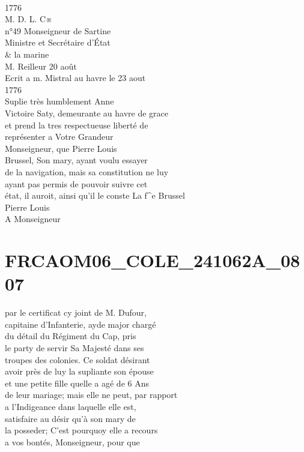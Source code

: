 \documentclass{article}
\begin{document}
\begin{pages}
\footnotesize \\
1776\\
M. D. L. C※\\
n°49
\normalsize \pstart
Monseigneur de Sartine\\
Ministre et Secrétaire d'État\\
\& la marine\\
M. Reilleur 20 août\\
Ecrit a m. Mistral au havre le 23 aout\\
1776\\
Suplie très humblement Anne\\
Victoire Saty, demeurante au havre de grace\\
et prend la tres respectueuse liberté de\\
représenter a Votre Grandeur\\
Monseigneur, que Pierre Louis\\
Brussel, Son mary, ayant voulu essayer\\
de la navigation, mais sa constitution ne luy\\
ayant pas permis de pouvoir suivre cet\\
état, il auroit, ainsi qu'il le conste
\pend\pstart
La f\^{}e Brussel\\
Pierre Louis\\
A Monseigneur
\pend
\endnumbering\beginnumbering\section{FRCAOM06\_COLE\_241062A\_0807}\pstart
par le certificat cy joint de M. Dufour,\\
capitaine d'Infanterie, ayde major chargé\\
du détail du Régiment du Cap, pris\\
le party de servir Sa Majesté dans ses\\
troupes des colonies. Ce soldat désirant\\
avoir près de luy la supliante son épouse\\
et une petite fille quelle a agé de 6 Ans\\
de leur mariage; mais elle ne peut, par rapport\\
a l'Indigeance dans laquelle elle est,\\
satisfaire au désir qu'à son mary de\\
la posseder; C'est pourquoy elle a recours\\
a vos bontés, Monseigneur, pour que\\

\end{pages}
\end{document}
